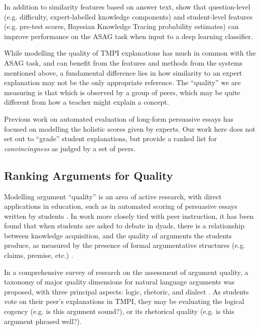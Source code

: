 \documentclass[notitlepage,12pt]{jedm}
\begin{document}
In addition to similarity features based on answer text, 
 show that question-level (e.g. difficulty, 
expert-labelled knowledge components) and student-level features (e.g. pre-test 
scores, Bayesian Knowledge Tracing probability estimates) can improve 
performance on the ASAG task when input to a deep learning classifier.

While modelling the quality of TMPI explanations has much in common with the 
ASAG task, and can benefit from the features and methods from the systems 
mentioned above, a fundamental difference lies in how similarity to an expert 
explanation may not be the only appropriate reference.
The ``quality'' we are measuring is that which is observed by a group of peers, 
which may be quite different from how a teacher might explain a concept.

Previous work on automated evaluation of long-form persuasive essays 
\cite{ghosh_coarse-grained_2016,klebanov_argumentation_2016,nguyen_argument_2018}
has focused on modelling the holistic scores given by experts.
Our work here does not set out to ``grade'' student explanations, but provide a 
ranked list for \textit{convincingness} as judged by a set of peers.


\subsection{Ranking Arguments for Quality}\label{sec:related_work:arg_quality}

Modelling argument ``quality'' is an area of active research, with direct 
applications in education, such as in automated scoring of 
persuasive essays written by students 
\cite{persing_modeling_2015,nguyen_argument_2018}.
In work more closely tied with peer instruction, it has been found that when 
students are asked to debate in dyads, there is a relationship between  
knowledge acquisition, and the quality of arguments the students produce, as 
measured by the presence of formal argumentative structures (e.g. claims, 
premise, etc.) \cite{garcia-mila_effect_2013}.

In a comprehensive survey of research on the assessment of argument quality, a 
taxonomy of major quality dimensions for natural language arguments was 
proposed, with three principal aspects: logic, rhetoric, and dialect 
\cite{wachsmuth_computational_2017}. 
As students vote on their peer's explanations in TMPI, they may be evaluating 
the logical cogency (e.g. is this argument sound?), or its rhetorical quality 
(e.g. is this argument phrased well?). 
\end{document}
